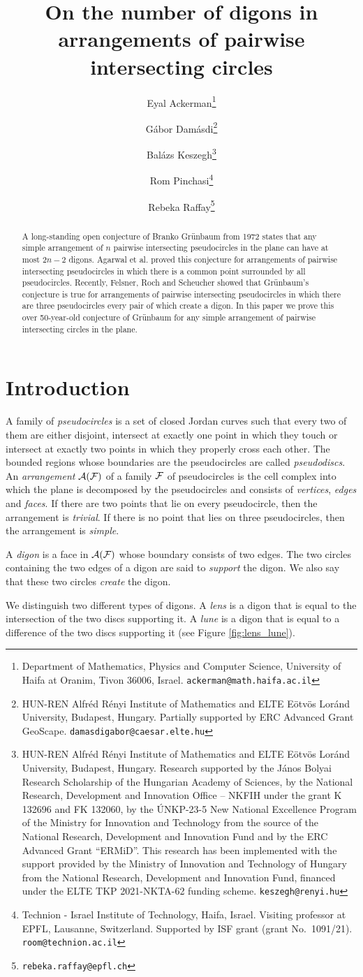 \documentclass[11pt,a4paper]{article}
\author{
	Eyal Ackerman\thanks{Department of Mathematics, Physics and Computer Science,
		University of Haifa at Oranim, 	Tivon 36006, Israel. \texttt{ackerman@math.haifa.ac.il}}\and
	G\'abor Dam\'asdi\thanks{HUN-REN Alfréd Rényi Institute of Mathematics and ELTE Eötvös Loránd University, Budapest, Hungary. Partially supported by ERC Advanced Grant GeoScape.
\texttt{damasdigabor@caesar.elte.hu}}\and
	Bal\'azs Keszegh\thanks{HUN-REN Alfréd Rényi Institute of Mathematics and ELTE Eötvös Loránd University, Budapest, Hungary. 
Research supported by the J\'anos Bolyai Research Scholarship of the Hungarian Academy of Sciences, by the National Research, Development and Innovation Office -- NKFIH under the grant K 132696 and FK 132060, by the \'UNKP-23-5 New National Excellence Program of the Ministry for Innovation and Technology from the source of the National Research, Development and Innovation Fund and by the ERC Advanced Grant ``ERMiD''. This research has been implemented with the support provided by the Ministry of Innovation and Technology of Hungary from the National Research, Development and Innovation Fund, financed under the  ELTE TKP 2021-NKTA-62 funding scheme. \texttt{keszegh@renyi.hu}}\and
	Rom Pinchasi\thanks{Technion - Israel Institute of Technology, Haifa, Israel. Visiting professor at EPFL, Lausanne, Switzerland. Supported by ISF grant (grant No.\ 1091/21). \texttt{room@technion.ac.il}}\and
	Rebeka Raffay\thanks{\texttt{rebeka.raffay@epfl.ch}}
}
\title{On the number of digons in arrangements of pairwise intersecting circles}
\newcommand{\F}{{\cal{F}}}
\newcommand{\A}{{\cal{A}}}
\begin{document}
	\maketitle
	
	\begin{abstract}
	A long-standing open conjecture of Branko Grünbaum from 1972 states that any simple arrangement of $n$ pairwise intersecting pseudocircles in the plane can have at most $2n-2$ digons.  Agarwal et al. proved this conjecture for arrangements of pairwise intersecting pseudocircles in which there is a common point surrounded by all pseudocircles. Recently, Felsner, Roch and Scheucher showed that Gr\"unbaum's conjecture is true for arrangements of pairwise intersecting pseudocircles in which there are three pseudocircles every pair of which create a digon. In this paper we prove this over 50-year-old conjecture of Gr\"unbaum for any simple arrangement of pairwise intersecting circles in the plane.  
		
	\end{abstract}
	
	
	\section{Introduction}

	A family of \emph{pseudocircles} is a set of closed Jordan curves such that every two of them are either disjoint, intersect at exactly one point in which they touch or intersect at exactly two points in which they properly cross each other.
The bounded regions whose boundaries are the pseudocircles are called \emph{pseudodiscs}.
An \emph{arrangement} $\A(\F)$ of a family $\F$ of pseudocircles is the cell complex into which the plane is decomposed by the pseudocircles and consists of \emph{vertices}, \emph{edges} and \emph{faces}.
If there are two points that lie on every pseudocircle, then the arrangement is \emph{trivial}.
If there is no point that lies on three pseudocircles, then the arrangement is \emph{simple}.

A \emph{digon} is a face in $\A(\F)$ whose boundary consists of two edges. The two circles containing the two edges of a digon are said to
\emph{support} the digon. We also say that these two circles \emph{create} the digon.

We distinguish two different types of digons. A \emph{lens}
is a digon that is equal to the intersection of the two discs
supporting it. A \emph{lune} is a digon that is equal to a difference of the two discs supporting it (see Figure \ref{fig:lens_lune}).
\end{document}
